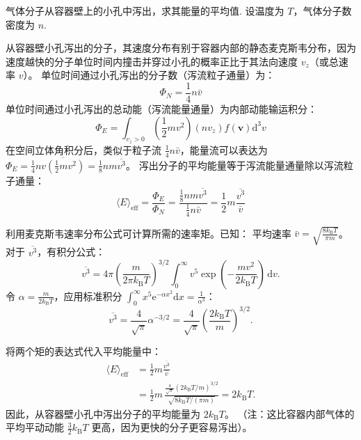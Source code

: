 \begin{exercise}\label{ex:13.10}
气体分子从容器壁上的小孔中泻出，求其能量的平均值. 设温度为 $T$，气体分子数密度为 $n$.
\end{exercise}
\begin{solution}
从容器壁小孔泻出的分子，其速度分布有别于容器内部的静态麦克斯韦分布，因为速度越快的分子单位时间内撞击并穿过小孔的概率正比于其法向速度 $v_z$（或总速率 $v$）。
单位时间通过小孔泻出的分子数（泻流粒子通量）为：
$$ \Phi_N = \frac{1}{4} n \bar{v} $$
单位时间通过小孔泻出的总动能（泻流能量通量）为内部动能输运积分：
$$ \Phi_E = \int_{v_z>0} \left(\frac{1}{2}mv^2\right) (n v_z) f(\boldsymbol{v}) \mathrm{d}^3v $$
在空间立体角积分后，类似于粒子流 $\frac{1}{4} n \bar{v}$，能量流可以表达为 $\Phi_E = \frac{1}{4} n \overline{v \left(\frac{1}{2}mv^2\right)} = \frac{1}{8} n m \overline{v^3}$。
泻出分子的平均能量等于泻流能量通量除以泻流粒子通量：
$$ \langle E \rangle_{\mathrm{eff}} = \frac{\Phi_E}{\Phi_N} = \frac{\frac{1}{8} n m \overline{v^3}}{\frac{1}{4} n \bar{v}} = \frac{1}{2} m \frac{\overline{v^3}}{\bar{v}} $$

利用麦克斯韦速率分布公式可计算所需的速率矩。已知：
平均速率 $\bar{v} = \sqrt{\frac{8 k_{\mathrm{B}} T}{\pi m}}$。
对于 $\overline{v^3}$，有积分公式：
\[
\overline{v^3}
=4\pi\left(\frac{m}{2\pi k_{\mathrm B}T}\right)^{3/2}
 \int_0^\infty v^5
 \exp\!\left(-\frac{mv^2}{2k_{\mathrm B}T}\right)\,\mathrm{d}v.
\]
令 $\alpha = \frac{m}{2k_{\mathrm{B}}T}$，应用标准积分 $\int_0^{\infty} x^5 \mathrm{e}^{-\alpha x^2} \mathrm{d}x = \frac{1}{\alpha^3}$：
\[
\overline{v^3}
=\frac{4}{\sqrt\pi}\alpha^{-3/2}
=\frac{4}{\sqrt\pi}
 \left(\frac{2k_{\mathrm B}T}{m}\right)^{3/2}.
\]

将两个矩的表达式代入平均能量中：
\[
\begin{aligned}
\langle E\rangle_{\mathrm{eff}}
 &=\frac12m\frac{\overline{v^3}}{\bar v}\\
 &=\frac12m\,
   \frac{\frac{4}{\sqrt\pi}(2k_{\mathrm B}T/m)^{3/2}}
        {\sqrt{8k_{\mathrm B}T/(\pi m)}}
 =2k_{\mathrm B}T.
\end{aligned}
\]
因此，从容器壁小孔中泻出分子的平均能量为 $2 k_{\mathrm{B}} T$。
（注：这比容器内部气体的平均平动动能 $\frac{3}{2} k_{\mathrm{B}} T$ 更高，因为更快的分子更容易泻出）。
\end{solution}

